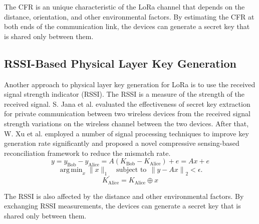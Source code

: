 The CFR is an unique characteristic of the LoRa channel that depends on the distance, orientation, and other environmental factors. By estimating the CFR at both ends of the communication link, the devices can generate a secret key that is shared only between them.
\subsection{RSSI-Based Physical Layer Key Generation}
Another approach to physical layer key generation for LoRa is to use the received signal strength indicator (RSSI). The RSSI is a measure of the strength of the received signal. S. Jana et al. evaluated the effectiveness of secret key extraction for private communication between two wireless devices from the received signal strength variations on the wireless channel between the two devices\cite{10.1145/1614320.1614356}. After that, W. Xu et al. employed a number of signal processing techniques to improve key generation rate significantly and proposed a novel compressive sensing-based reconciliation framework to reduce the mismatch rate\cite{8580375}. 
\begin{equation} y = y_{\mathrm{ Bob}}-y_{\mathrm{ Alice}}= A \left ({K_{\mathrm{ Bob}}-K_{\mathrm{ Alice}}}\right) + e= A x +e \end{equation} 
\begin{equation} \mathop {\mathrm {arg\,min}} _{x} \| x \|_{1} \quad \text {subject to}~ ~\left \|{y - Ax}\right \|_{2} < \epsilon.\end{equation} 
\begin{equation}K_{\mathrm{ Alice}}^{'} = K_{\mathrm{ Alice}} \oplus x\end{equation} 

The RSSI is also affected by the distance and other environmental factors. By exchanging RSSI measurements, the devices can generate a secret key that is shared only between them.

